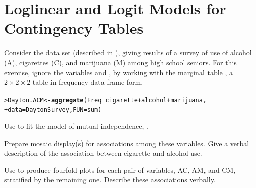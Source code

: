 \documentclass[10pt]{report}\usepackage[]{graphicx}\usepackage[]{color}
\makeatletter
\newcommand{\hlopt}[1]{\textcolor[rgb]{0,0,0}{#1}}%
\newcommand{\hlstd}[1]{\textcolor[rgb]{0.345,0.345,0.345}{#1}}%
\newcommand{\hlkwb}[1]{\textcolor[rgb]{0.69,0.353,0.396}{#1}}%
\newcommand{\hlkwc}[1]{\textcolor[rgb]{0.333,0.667,0.333}{#1}}%
\newcommand{\hlkwd}[1]{\textcolor[rgb]{0.737,0.353,0.396}{\textbf{#1}}}%
\newenvironment{kframe}{%
 \def\at@end@of@kframe{}%
 \ifinner\ifhmode%
  \def\at@end@of@kframe{\end{minipage}}%
  \begin{minipage}{\columnwidth}%
 \fi\fi%
 \def\FrameCommand##1{\hskip\@totalleftmargin \hskip-\fboxsep
 \colorbox{shadecolor}{##1}\hskip-\fboxsep
     \hskip-\linewidth \hskip-\@totalleftmargin \hskip\columnwidth}%
 \MakeFramed {\advance\hsize-\width
   \@totalleftmargin\z@ \linewidth\hsize
   \@setminipage}}%
 {\par\unskip\endMakeFramed%
 \at@end@of@kframe}
\newenvironment{knitrout}{}{} %
\renewenvironment{knitrout}{\small\renewcommand{\baselinestretch}{.85}}{} %
\makeatother
\begin{document}
\clearpage
\chapter{Loglinear and Logit Models for Contingency Tables}\label{ch:loglin}

\begin{Exercises}

  \exercise Consider the data set  (described in ), giving
  results of a survey of use of alcohol (A), cigarettes (C), and marijuana (M) among high school
  seniors.  For this exercise, ignore the variables  and , by working with the
  marginal table , a $2 \times 2 \times 2$ table in frequency data frame form.
\begin{knitrout}\footnotesize
{}\color{fgcolor}\begin{kframe}
\begin{alltt}
\hlstd{> }\hlstd{Dayton.ACM} \hlkwb{<-} \hlkwd{aggregate}\hlstd{(Freq} \hlopt{~} \hlstd{cigarette} \hlopt{+} \hlstd{alcohol} \hlopt{+} \hlstd{marijuana,}
\hlstd{+ }                        \hlkwc{data}\hlstd{=DaytonSurvey,} \hlkwc{FUN}\hlstd{=sum)}
\end{alltt}
\end{kframe}
\end{knitrout}
  \begin{enumerate*}
  
    \item Use  to fit the model of mutual independence, .
    \begin{ans}
    \end{ans}
    
    \item Prepare mosaic display(s) for associations among these variables.
    Give a verbal description of the association between cigarette and alcohol use.
    \begin{ans}
    \end{ans}
    
    \item Use  to produce fourfold plots for each pair of variables,
    AC, AM, and CM, stratified by the remaining one.
    Describe these associations verbally.
    \begin{ans}
    \end{ans}
    
  \end{enumerate*}
  

\end{Exercises}
\end{document}
